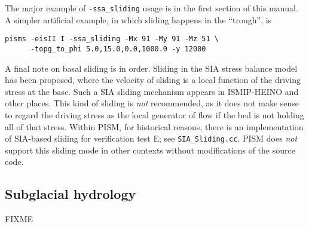 The major example of \texttt{-ssa_sliding} usage is in the first section of this manual.  A simpler artificial example, in which sliding happens in the ``trough'', is
\begin{verbatim}
pisms -eisII I -ssa_sliding -Mx 91 -My 91 -Mz 51 \
      -topg_to_phi 5.0,15.0,0.0,1000.0 -y 12000
\end{verbatim}

A final note on basal sliding is in order.  Sliding in the SIA stress balance model has been proposed, where the velocity of sliding is a local function of the driving stress at the base.  Such a SIA sliding mechanism appears in ISMIP-HEINO \cite{Calovetal2009HEINOfinal} and other places.  This kind of sliding is \emph{not} recommended, as it does not make sense to regard the driving stress as the local generator of flow if the bed is not holding all of that stress.  Within PISM, for historical reasons, there is an implementation of SIA-based sliding for verification test E; see \texttt{SIA_Sliding.cc}.  PISM does \emph{not} support this sliding mode in other contexts without modifications of the source code.


\subsection{Subglacial hydrology}  \label{subsect:subhydro}

FIXME

